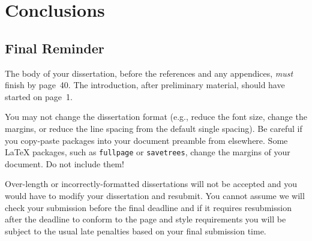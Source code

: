 \documentclass[logo,bsc,singlespacing,parskip,online]{infthesis}
\renewenvironment{code}{\mintedcopy[breaklines,breaksymbolleft=\;]{agda}}{\endmintedcopy}
\begin{document}
\begin{comment}
\begin{code}
  ax1-term i a b (free x) = refl
  ax1-term i a b (bound k) with i ≟ℕ k
  ... | yes refl = refl
  ... | no  i≢k  with i ≟ℕ k
  ... |   yes refl = contradiction refl i≢k
  ... |   no  _    = refl
  ax1-term i a b (ƛ A , L) rewrite ax1-term (suc i) a b L = refl
  ax1-term i a b (L · M)
    rewrite ax1-term i a b L | ax1-term i a b M = refl
  ax1-term i a b ‵zero = refl
  ax1-term i a b (‵suc L) rewrite ax1-term i a b L = refl

  ax5-term i j a b (free x) i≢j = refl
  ax5-term i j a b (bound k) i≢j with j ≟ℕ k
  ... | yes refl with i ≟ℕ j
  ... |   yes refl = contradiction refl i≢j
  ... |   no  i≢j with j ≟ℕ j
  ... |     yes refl = refl
  ... |     no  j≢j  = contradiction refl j≢j
  ax5-term i j a b (bound k) i≢j | no j≢k with i ≟ℕ k
  ... | yes refl = refl
  ... | no  i≢k with j ≟ℕ k
  ... |   yes refl = contradiction refl j≢k
  ... |   no  j≢k  = refl
  ax5-term i j a b (ƛ A , L) i≢j
    rewrite ax5-term (suc i) (suc j) a b L (suc-preserves-≢ i≢j)
      = refl
  ax5-term i j a b (L · M) i≢j
    rewrite ax5-term i j a b L i≢j | ax5-term i j a b M i≢j = refl
  ax5-term i j a b ‵zero i≢j = refl
  ax5-term i j a b (‵suc L) i≢j rewrite ax5-term i j a b L i≢j
    = refl
\end{code}
\end{comment}

\chapter{Conclusions}

\section{Final Reminder}

The body of your dissertation, before the references and any appendices,
\emph{must} finish by page~40. The introduction, after preliminary material,
should have started on page~1.

You may not change the dissertation format (e.g., reduce the font size, change
the margins, or reduce the line spacing from the default single spacing). Be
careful if you copy-paste packages into your document preamble from elsewhere.
Some \LaTeX{} packages, such as \texttt{fullpage} or \texttt{savetrees}, change
the margins of your document. Do not include them!

Over-length or incorrectly-formatted dissertations will not be accepted and you
would have to modify your dissertation and resubmit. You cannot assume we will
check your submission before the final deadline and if it requires resubmission
after the deadline to conform to the page and style requirements you will be
subject to the usual late penalties based on your final submission time.
\end{document}
